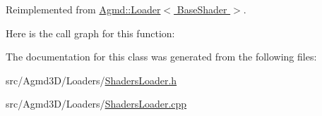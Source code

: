 Reimplemented from \hyperlink{class_agmd_1_1_loader_abf633648c648f0c6152a559c3e4be682}{Agmd\+::\+Loader$<$ Base\+Shader $>$}.



Here is the call graph for this function\+:




The documentation for this class was generated from the following files\+:\begin{DoxyCompactItemize}
\item 
src/\+Agmd3\+D/\+Loaders/\hyperlink{_shaders_loader_8h}{Shaders\+Loader.\+h}\item 
src/\+Agmd3\+D/\+Loaders/\hyperlink{_shaders_loader_8cpp}{Shaders\+Loader.\+cpp}\end{DoxyCompactItemize}
